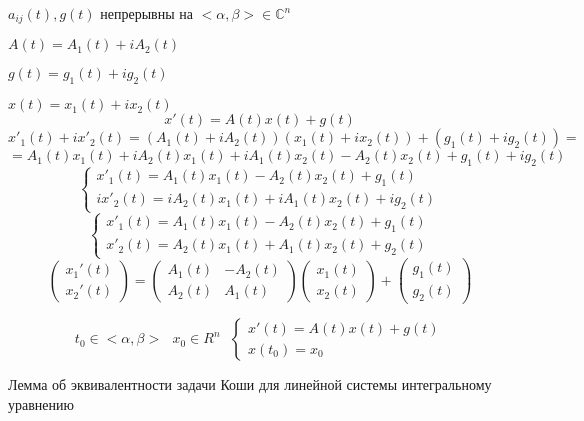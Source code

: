 \begin{block}
  $a_{ij}(t), g(t)$ непрерывны на $<\alpha, \beta> \in \mathbb{C}^n$

  $A(t) = A_1(t) + iA_2(t)$

  $g(t) = g_1(t) + ig_2(t)$

  $x(t) = x_1(t) + ix_2(t)$
  $$
  x'(t) = A(t)x(t) + g(t)
  $$
  $$
  x'_1(t) + ix'_2(t) = (A_1(t) + iA_2(t)) (x_1(t) + ix_2(t)) +
  (g_1(t) + ig_2(t)) =
  $$
  $$
  = A_1(t)x_1(t) + iA_2(t)x_1(t) + iA_1(t)x_2(t) - A_2(t)x_2(t) +
  g_1(t) + ig_2(t)
  $$
  $$
  \left\{
  \begin{array}{l}
    x'_1(t) = A_1(t)x_1(t) - A_2(t)x_2(t) + g_1(t) \\
    ix'_2(t) = iA_2(t)x_1(t) + iA_1(t)x_2(t) + ig_2(t)
  \end{array}
  \right.
  $$
  $$
  \left\{
  \begin{array}{l}
    x'_1(t) = A_1(t)x_1(t) - A_2(t)x_2(t) + g_1(t) \\
    x'_2(t) = A_2(t)x_1(t) + A_1(t)x_2(t) + g_2(t)
  \end{array}
  \right.
  $$
  $$
  \left(
  \begin{array}{c}
    x_1'(t) \\
    x_2'(t)
  \end{array}
  \right) =
  \left(
  \begin{array}{cc}
    A_1(t) & -A_2(t) \\
    A_2(t) & A_1(t)
  \end{array}
  \right)
  \left(
  \begin{array}{c}
    x_1(t) \\
    x_2(t)
  \end{array}
  \right) +
  \left(
  \begin{array}{c}
    g_1(t) \\
    g_2(t)
  \end{array}
  \right)
  $$
\end{block}

\begin{block}
  $$
  t_0 \in <\alpha, \beta> ~~~ x_0 \in R^n ~~~
  \left\{
  \begin{array}{l}
    x'(t) = A(t)x(t) + g(t) \\
    x(t_0) = x_0
  \end{array}
  \right.
  $$
\end{block}

\begin{title}[\Large]
  Лемма об эквивалентности задачи Коши для линейной системы интегральному
  уравнению
\end{title}

